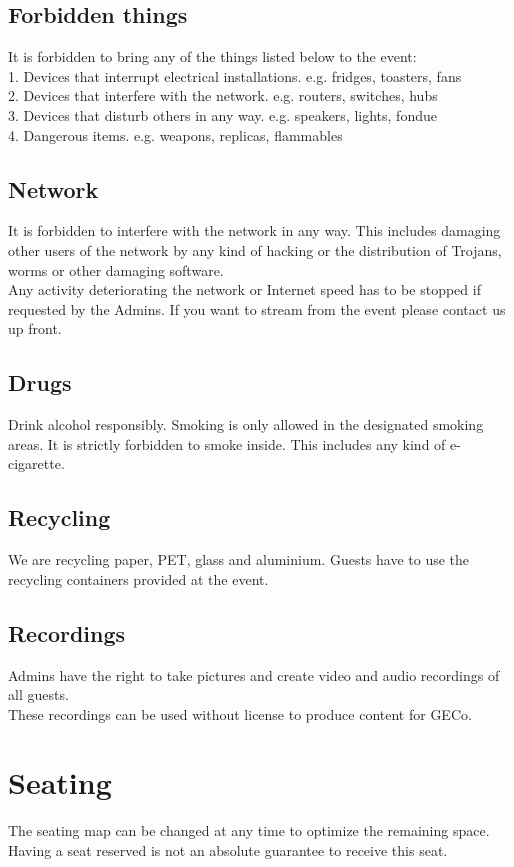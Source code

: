 \documentclass{article}
\begin{document}
\subsection{Forbidden things}
It is forbidden to bring any of the things listed below to the event:\\
1. Devices that interrupt electrical installations. e.g. fridges, toasters, fans\\
2. Devices that interfere with the network. e.g. routers, switches, hubs \\
3. Devices that disturb others in any way. e.g. speakers, lights, fondue\\
4. Dangerous items. e.g. weapons, replicas, flammables




\subsection{Network}
It is forbidden to interfere with the network in any way. This includes damaging other users of the network by any kind of hacking or the distribution of Trojans, worms or other damaging software.\\
Any activity deteriorating the network or Internet speed has to be stopped if requested by the Admins. If you want to stream from the event please contact us up front.


\subsection{Drugs}
Drink alcohol responsibly. 
Smoking is only allowed in the designated smoking areas.
It is strictly forbidden to smoke inside.
This includes any kind of e-cigarette. 

\subsection{Recycling}
We are recycling paper, PET, glass and aluminium. Guests have to use the recycling containers provided at the event.


\subsection{Recordings}
Admins have the right to take pictures and create video and audio recordings of all guests.\\
These recordings can be used without license to produce content for GECo.


\section{Seating}
The seating map can be changed at any time to optimize the remaining space.
Having a seat reserved is not an absolute guarantee to receive this seat.
\end{document}
